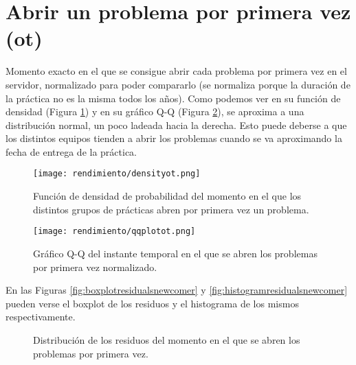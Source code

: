 



\section{Abrir un problema por primera vez (ot)}

Momento exacto en el que se consigue abrir cada problema por primera vez en el servidor, normalizado para poder compararlo (se normaliza porque la duración de la práctica no es la misma todos los años). Como podemos ver en su función de densidad (Figura \ref{fig:densityplotnewcomer}) y en su gráfico Q-Q (Figura \ref{fig:q-qot}), se aproxima a una distribución normal, un poco ladeada hacia la derecha. Esto puede deberse a que los distintos equipos tienden a abrir los problemas cuando se va aproximando la fecha de entrega de la práctica.

\begin{figure}[H]
    \centering
    \texttt{[image: rendimiento/densityot.png]}
    \caption{Función de densidad de probabilidad del momento en el que los distintos grupos de prácticas abren por primera vez un problema.}
    \label{fig:densityplotnewcomer}
\end{figure}

\begin{figure}[H]
    \centering
    \texttt{[image: rendimiento/qqplotot.png]}
    \caption{Gráfico Q-Q del instante temporal en el que se abren los problemas por primera vez normalizado.}
    \label{fig:q-qot}
\end{figure}

En las Figuras \ref{fig:boxplotresidualsnewcomer} y \ref{fig:histogramresidualsnewcomer} pueden verse el boxplot de los residuos y el histograma de los mismos respectivamente.

\begin{figure}[H]
\centering
{}\qquad
{}
\caption{Distribución de los residuos del momento en el que se abren los problemas por primera vez.}
\label{fig:newcomer}
\end{figure}

